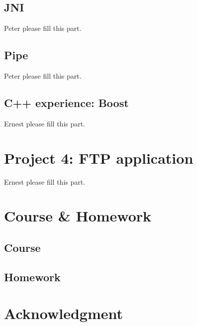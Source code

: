 \documentclass[conference,compsoc]{IEEEtran}
\begin{document}
	\subsection{JNI}
		Peter please fill this part.
	
	\subsection{Pipe}
		Peter please fill this part.
	
	\subsection{C++ experience: Boost}
		Ernest please fill this part.

\section{Project 4: FTP application}
	Ernest please fill this part.

\section{Course \& Homework}
	
	\subsection{Course}
	
	\subsection{Homework}

\section*{Acknowledgment}





\end{document}
